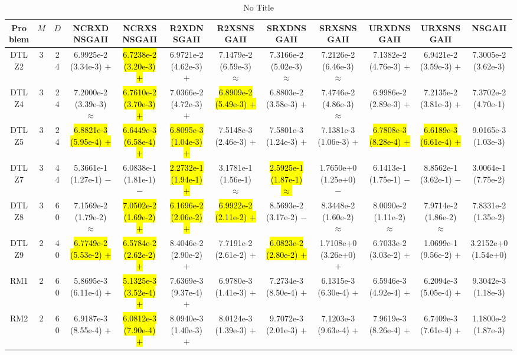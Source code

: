 \documentclass[journal]{IEEEtran}
\begin{document}
\begin{table*}[htbp]
\renewcommand{\arraystretch}{1.2}
\centering
\caption{No Title}
\begin{tabular}{cccccccccccc}
\toprule
Problem&$M$&$D$&NCRXDNSGAII&NCRXSNSGAII&R2XDNSGAII&R2XSNSGAII&SRXDNSGAII&SRXSNSGAII&URXDNSGAII&URXSNSGAII&NSGAII\\
\midrule
\multirow{1}{*}{DTLZ2}&3&24&6.9925e-2 (3.34e-3) $+$&\hl{6.7238e-2 (3.20e-3) $+$}&6.9721e-2 (4.62e-3) $+$&7.1479e-2 (6.59e-3) $\approx$&7.3166e-2 (5.02e-3) $\approx$&7.2126e-2 (6.46e-3) $\approx$&7.1382e-2 (4.76e-3) $+$&6.9421e-2 (3.59e-3) $+$&7.3005e-2 (3.62e-3)\\
\hline
\multirow{1}{*}{DTLZ4}&3&24&7.2000e-2 (3.39e-3) $\approx$&\hl{6.7610e-2 (3.70e-3) $+$}&7.0366e-2 (4.72e-3) $+$&\hl{6.8909e-2 (5.49e-3) $+$}&6.8803e-2 (3.58e-3) $+$&7.4746e-2 (4.86e-3) $\approx$&6.9986e-2 (2.89e-3) $+$&7.2135e-2 (3.81e-3) $+$&7.3702e-2 (4.70e-1)\\
\hline
\multirow{1}{*}{DTLZ5}&3&24&\hl{6.8821e-3 (5.95e-4) $+$}&\hl{6.6449e-3 (6.58e-4) $+$}&\hl{6.8095e-3 (1.04e-3) $+$}&7.5148e-3 (2.46e-3) $+$&7.5801e-3 (1.24e-3) $+$&7.1381e-3 (1.06e-3) $+$&\hl{6.7808e-3 (8.28e-4) $+$}&\hl{6.6189e-3 (6.61e-4) $+$}&9.0165e-3 (1.03e-3)\\
\hline
\multirow{1}{*}{DTLZ7}&3&44&5.3661e-1 (1.27e-1) $-$&6.0838e-1 (1.81e-1) $-$&\hl{2.2732e-1 (1.94e-1) $+$}&3.1781e-1 (1.56e-1) $\approx$&\hl{2.5925e-1 (1.87e-1) $\approx$}&1.7650e+0 (1.25e+0) $-$&6.1413e-1 (1.75e-1) $-$&8.8562e-1 (3.62e-1) $-$&3.0064e-1 (7.75e-2)\\
\hline
\multirow{1}{*}{DTLZ8}&3&60&7.1569e-2 (1.79e-2) $\approx$&\hl{7.0502e-2 (1.69e-2) $+$}&\hl{6.1696e-2 (2.06e-2) $+$}&\hl{6.9922e-2 (2.11e-2) $+$}&8.5693e-2 (3.17e-2) $-$&8.3448e-2 (1.60e-2) $\approx$&8.0090e-2 (1.11e-2) $\approx$&7.9714e-2 (1.86e-2) $\approx$&7.8331e-2 (1.35e-2)\\
\hline
\multirow{1}{*}{DTLZ9}&2&40&\hl{6.7749e-2 (5.53e-2) $+$}&\hl{6.5784e-2 (2.62e-2) $+$}&8.4046e-2 (2.90e-2) $+$&7.7191e-2 (2.61e-2) $+$&\hl{6.0823e-2 (2.80e-2) $+$}&1.7108e+0 (3.26e+0) $+$&6.7033e-2 (3.03e-2) $+$&1.0699e-1 (9.56e-2) $+$&3.2152e+0 (1.54e+0)\\
\hline
\multirow{1}{*}{RM1}&2&60&5.8695e-3 (6.11e-4) $+$&\hl{5.1325e-3 (3.52e-4) $+$}&7.6369e-3 (9.37e-4) $+$&6.9780e-3 (1.41e-3) $+$&7.2734e-3 (8.50e-4) $+$&6.1315e-3 (6.30e-4) $+$&6.5946e-3 (4.92e-4) $+$&6.2094e-3 (5.05e-4) $+$&9.3042e-3 (1.18e-3)\\
\hline
\multirow{1}{*}{RM2}&2&60&6.9187e-3 (8.55e-4) $+$&\hl{6.0812e-3 (7.90e-4) $+$}&8.0940e-3 (1.40e-3) $+$&8.0124e-3 (1.39e-3) $+$&9.7072e-3 (2.01e-3) $+$&7.1203e-3 (9.63e-4) $+$&7.9619e-3 (8.26e-4) $+$&6.7409e-3 (7.61e-4) $+$&1.1800e-2 (1.87e-3)\\

\end{tabular}
\end{table*}
\end{document}
